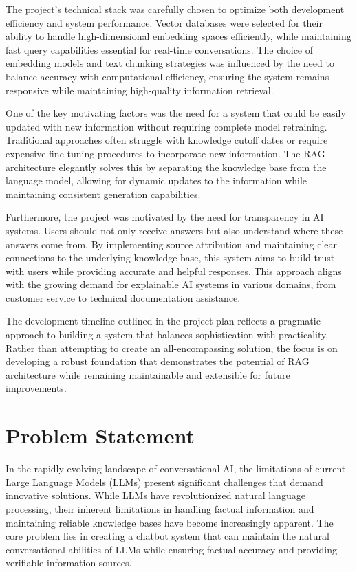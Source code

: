 \documentclass[12pt,a4paper]{report}
\begin{document}
The project's technical stack was carefully chosen to optimize both development efficiency and system performance. Vector databases were selected for their ability to handle high-dimensional embedding spaces efficiently, while maintaining fast query capabilities essential for real-time conversations. The choice of embedding models and text chunking strategies was influenced by the need to balance accuracy with computational efficiency, ensuring the system remains responsive while maintaining high-quality information retrieval.

One of the key motivating factors was the need for a system that could be easily updated with new information without requiring complete model retraining. Traditional approaches often struggle with knowledge cutoff dates or require expensive fine-tuning procedures to incorporate new information. The RAG architecture elegantly solves this by separating the knowledge base from the language model, allowing for dynamic updates to the information while maintaining consistent generation capabilities.

Furthermore, the project was motivated by the need for transparency in AI systems. Users should not only receive answers but also understand where these answers come from. By implementing source attribution and maintaining clear connections to the underlying knowledge base, this system aims to build trust with users while providing accurate and helpful responses. This approach aligns with the growing demand for explainable AI systems in various domains, from customer service to technical documentation assistance.

The development timeline outlined in the project plan reflects a pragmatic approach to building a system that balances sophistication with practicality. Rather than attempting to create an all-encompassing solution, the focus is on developing a robust foundation that demonstrates the potential of RAG architecture while remaining maintainable and extensible for future improvements.

\section{Problem Statement}

In the rapidly evolving landscape of conversational AI, the limitations of current Large Language Models (LLMs) present significant challenges that demand innovative solutions. While LLMs have revolutionized natural language processing, their inherent limitations in handling factual information and maintaining reliable knowledge bases have become increasingly apparent. The core problem lies in creating a chatbot system that can maintain the natural conversational abilities of LLMs while ensuring factual accuracy and providing verifiable information sources.
\end{document}

